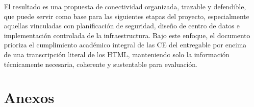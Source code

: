 \documentclass[11pt, a4paper, oneside]{report}
\begin{document}
El resultado es una propuesta de conectividad organizada, trazable y defendible, que puede servir como base para las siguientes etapas del proyecto, especialmente aquellas vinculadas con planificación de seguridad, diseño de centro de datos e implementación controlada de la infraestructura. Bajo este enfoque, el documento prioriza el cumplimiento académico integral de las CE del entregable por encima de una transcripción literal de los HTML, manteniendo solo la información técnicamente necesaria, coherente y sustentable para evaluación.







\chapter*{Anexos}
\end{document}
